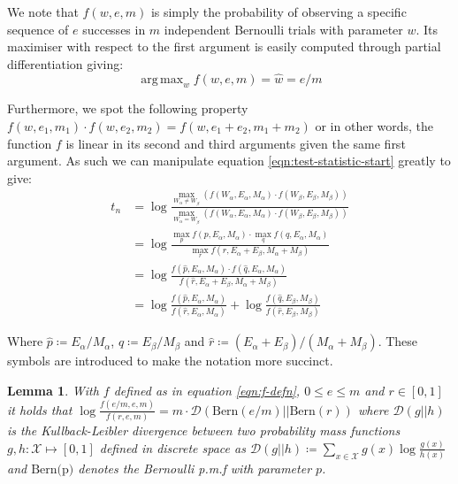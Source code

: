 \documentclass[]{article}
\DeclareMathOperator*{\argmax}{arg\,max}
\newcommand{\Xcal}{\mathcal{X}}
\newcommand{\kl}{\mathcal{D}}
\newtheorem{lemma}[theorem]{Lemma}
\begin{document}
We note that $f(w, e, m)$ is simply the probability of observing a specific sequence of $e$ successes in $m$ independent Bernoulli trials with parameter $w$. Its maximiser with respect to the first argument is easily computed through partial differentiation giving:
%
\begin{equation}
	\argmax_w f(w, e, m) = \hat{w} = e / m
	\label{eqn:f-maximiser}
\end{equation}

Furthermore, we spot the following property $f(w, e_1, m_1) \cdot f(w, e_2, m_2) = f(w, e_1 + e_2, m_1 + m_2)$ or in other words, the function $f$ is linear in its second and third arguments given the same first argument. As such we can manipulate equation \ref{eqn:test-statistic-start} greatly to give:
%
\begin{align}
	t_n &= \log \frac
	{
		\max_{W_{\alpha} \neq W_{\beta}}(f (W_\alpha, E_\alpha, M_\alpha) \cdot f (W_\beta, E_\beta, M_\beta))
	}
	{
		\max_{W_\alpha = W_\beta} (f (W_\alpha, E_\alpha, M_\alpha) \cdot f (W_\beta, E_\beta, M_\beta))
	} \nonumber \\
	&= \log \frac{
		\max_p f(p, E_\alpha, M_\alpha) \cdot \max_q f(q, E_\alpha, M_\alpha)
	}{
		\max_r f(r, E_\alpha + E_\beta, M_\alpha + M_\beta)
	} \nonumber \\
	&= \log \frac{
		f(\hat{p}, E_\alpha, M_\alpha) \cdot f(\hat{q}, E_\alpha, M_\alpha)
	}{
		f(\hat{r}, E_\alpha + E_\beta, M_\alpha + M_\beta)
	} \nonumber \\
	&= \log \frac{f(\hat{p}, E_\alpha, M_\alpha)}{f(\hat{r}, E_\alpha, M_\alpha)} + \log \frac{f(\hat{q}, E_\beta, M_\beta)}{f(\hat{r}, E_\beta, M_\beta)}
\end{align}

Where $\hat{p} \coloneqq E_\alpha / M_\alpha$, $\hat{q} \coloneqq E_\beta / M_\beta$ and $\hat{r} \coloneqq (E_\alpha + E_\beta) / (M_\alpha + M_\beta)$. These symbols are introduced to make the notation more succinct.

\begin{lemma}
	With $f$ defined as in equation \ref{eqn:f-defn}, $0 \leq e \leq m$ and $r \in [0, 1]$ it holds that $\log \frac{f(e/m, e, m)}{f(r, e, m)} = m \cdot \kl \left( \textrm{Bern}(e/m) || \textrm{Bern}(r) \right)$ where $\kl(g || h)$ is the Kullback-Leibler divergence between two probability mass functions $g, h: \Xcal \mapsto [0, 1]$ defined in discrete space as $\kl(g || h) \coloneqq \sum_{x \in \Xcal} g(x) \log \frac{g(x)}{h(x)}$ and $\textrm{Bern(p)}$ denotes the Bernoulli p.m.f with parameter $p$.
	\label{lem:kl-div}
\end{lemma}
\end{document}
